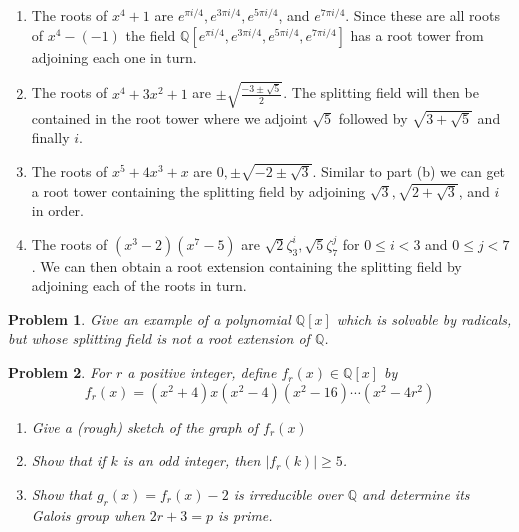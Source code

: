 \documentclass[10pt]{article}
\newcommand{\sk}{\vskip 10mm}
\newcommand{\bb}[1]{\mathbb{#1}}
\theoremstyle{plain}
\newtheorem{problem}{Problem}
\theoremstyle{remark}
\begin{document}
\begin{enumerate}
\item [(a)] The roots of $x^4+1$ are $e^{\pi i/4},e^{3\pi i/4},e^{5\pi i/4}$, and $e^{7\pi i/4}$.
  Since these are all roots of $x^4-(-1)$ the field
  $\bb{Q}[e^{\pi i/4},e^{3\pi i/4},e^{5\pi i/4},e^{7\pi i/4}]$ has a root tower from adjoining
  each one in turn.
\item [(b)] The roots of $x^4+3x^2+1$ are $\pm\sqrt{\frac{-3\pm\sqrt{5}}{2}}$. The splitting
  field will then be contained in the root tower where we adjoint $\sqrt{5}$ followed
  by $\sqrt{3+\sqrt{5}}$ and finally $i$.
\item [(c)] The roots of $x^5+4x^3+x$ are $0,\pm\sqrt{-2\pm\sqrt{3}}$. Similar to part (b)
  we can get a root tower containing the splitting field by adjoining
  $\sqrt{3},\sqrt{2+\sqrt{3}}$, and $i$ in order.
\item [(d)] The roots of $(x^3-2)(x^7-5)$ are $\sqrt{2}\zeta_3^i,\sqrt{5}\zeta_7^j$ for $0\leq i<3$ and
  $0\leq j<7$. We can then obtain a root extension containing the splitting field by
  adjoining each of the roots in turn.
\end{enumerate}

\sk

\begin{problem}
  Give an example of a polynomial $\bb{Q}[x]$ which is solvable by radicals,
  but whose splitting field is not a root extension of $\bb{Q}$.
\end{problem}


\sk

\begin{problem}
  For $r$ a positive integer, define $f_r(x)\in\bb{Q}[x]$ by
  \[
    f_r(x)=(x^2+4)x(x^2-4)(x^2-16)\cdots(x^2-4r^2)
  \]
  \begin{enumerate}
  \item[(a)] Give a (rough) sketch of the graph of $f_r(x)$
  \item[(b)] Show that if $k$ is an odd integer, then $|f_r(k)|\geq 5$.
  \item[(c)] Show that $g_r(x)=f_r(x)-2$ is irreducible over $\bb{Q}$ and
    determine its Galois group when $2r+3=p$ is prime.
  \end{enumerate}
\end{problem}
\end{document}

